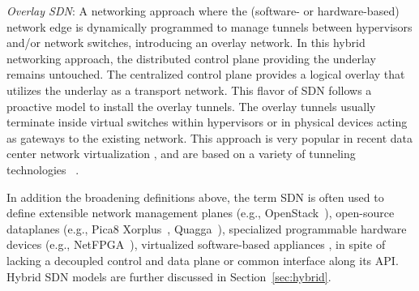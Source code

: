 \noindent \textit{Overlay SDN}: A networking approach where the (software- or hardware-based) network edge 
is dynamically programmed to manage tunnels between hypervisors and/or network switches, introducing an 
overlay network. In this hybrid networking approach, the distributed control plane providing the underlay 
remains untouched. The centralized control plane provides a logical overlay that utilizes the underlay 
as a transport network. This flavor of SDN follows a proactive model to install the overlay tunnels. The overlay
tunnels usually terminate inside virtual switches within hypervisors or in physical devices acting as gateways 
to the existing network. This approach is very popular in recent data center network virtualization \cite{chowdhury2010}, and are based on a variety of tunneling technologies ~\cite{jain2013}.


In addition the broadening definitions above, the term SDN is often used to define extensible network management planes (e.g., OpenStack~\cite{corradi2014}),  open-source dataplanes (e.g., Pica8 Xorplus~\cite{shang2014}, Quagga~\cite{jakma2014}), specialized programmable hardware devices (e.g., 
NetFPGA~\cite{netfpga2014}), virtualized software-based appliances , in spite of 
lacking a decoupled control and data plane or common interface along its API. Hybrid SDN models are further discussed in Section~\ref{sec:hybrid}. 


